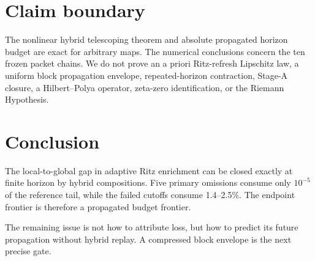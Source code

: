 \documentclass[11pt]{article}
\theoremstyle{definition}
\theoremstyle{remark}
\begin{document}
\section{Claim boundary}

The nonlinear hybrid telescoping theorem and absolute propagated horizon
budget are exact for arbitrary maps.  The numerical conclusions concern the
ten frozen packet chains.  We do not prove an a priori Ritz-refresh Lipschitz
law, a uniform block propagation envelope, repeated-horizon contraction,
Stage-A closure, a Hilbert--Polya operator, zeta-zero identification, or the
Riemann Hypothesis.

\section{Conclusion}

The local-to-global gap in adaptive Ritz enrichment can be closed exactly at
finite horizon by hybrid compositions.  Five primary omissions consume only
$10^{-5}$ of the reference tail, while the failed cutoffs consume 1.4--2.5\%.
The endpoint frontier is therefore a propagated budget frontier.

The remaining issue is not how to attribute loss, but how to predict its
future propagation without hybrid replay.  A compressed block envelope is
the next precise gate.



\end{document}
